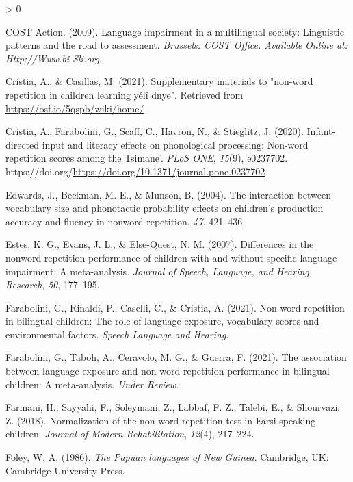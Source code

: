 \documentclass[
  american,
  ,man,floatsintext]{apa6}
\newlength{\cslhangindent}
\newenvironment{CSLReferences}[2] %
 {%
  \setlength{\parindent}{0pt}
  \ifodd #1 \everypar{\setlength{\hangindent}{\cslhangindent}}\ignorespaces\fi
  \ifnum #2 > 0
  \setlength{\parskip}{#2\baselineskip}
  \fi
 }%
 {}
\begin{document}
\begin{CSLReferences}{1}{0}
\leavevmode\hypertarget{ref-is08042009language}{}%
COST Action. (2009). Language impairment in a multilingual society: Linguistic patterns and the road to assessment. \emph{Brussels: COST Office. Available Online at: Http://Www.bi-Sli.org}.

\leavevmode\hypertarget{ref-cristia2021supplementary}{}%
Cristia, A., \& Casillas, M. (2021). Supplementary materials to "non-word repetition in children learning yélî dnye". Retrieved from \url{https://osf.io/5qspb/wiki/home/}

\leavevmode\hypertarget{ref-cristia2020infant}{}%
Cristia, A., Farabolini, G., Scaff, C., Havron, N., \& Stieglitz, J. (2020). Infant-directed input and literacy effects on phonological processing: Non-word repetition scores among the {T}simane'. \emph{PLoS ONE}, \emph{15}(9), e0237702. https://doi.org/\url{https://doi.org/10.1371/journal.pone.0237702}

\leavevmode\hypertarget{ref-edwards2004interaction}{}%
Edwards, J., Beckman, M. E., \& Munson, B. (2004). The interaction between vocabulary size and phonotactic probability effects on children's production accuracy and fluency in nonword repetition, \emph{47}, 421--436.

\leavevmode\hypertarget{ref-estes2007differences}{}%
Estes, K. G., Evans, J. L., \& Else-Quest, N. M. (2007). Differences in the nonword repetition performance of children with and without specific language impairment: A meta-analysis. \emph{Journal of Speech, Language, and Hearing Research}, \emph{50}, 177--195.

\leavevmode\hypertarget{ref-farabolini2021nonword}{}%
Farabolini, G., Rinaldi, P., Caselli, C., \& Cristia, A. (2021). Non-word repetition in bilingual children: The role of language exposure, vocabulary scores and environmental factors. \emph{Speech Language and Hearing}.

\leavevmode\hypertarget{ref-farabolini2021association}{}%
Farabolini, G., Taboh, A., Ceravolo, M. G., \& Guerra, F. (2021). The association between language exposure and non-word repetition performance in bilingual children: A meta-analysis. \emph{Under Review}.

\leavevmode\hypertarget{ref-farmani2018normalization}{}%
Farmani, H., Sayyahi, F., Soleymani, Z., Labbaf, F. Z., Talebi, E., \& Shourvazi, Z. (2018). Normalization of the non-word repetition test in {F}arsi-speaking children. \emph{Journal of Modern Rehabilitation}, \emph{12}(4), 217--224.

\leavevmode\hypertarget{ref-foley1986papuan}{}%
Foley, W. A. (1986). \emph{{The Papuan languages of New Guinea}}. Cambridge, UK: Cambridge University Press.


\end{CSLReferences}
\end{document}
